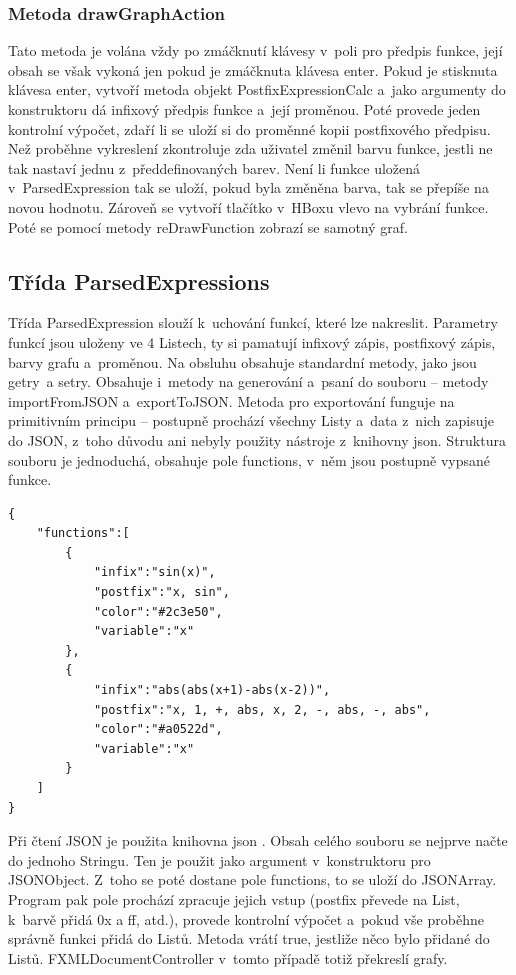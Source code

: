 \documentclass[a4paper,oneside,12p]{report}
\begin{document}
\subsubsection{Metoda drawGraphAction}

Tato metoda je volána vždy po zmáčknutí klávesy v~poli pro předpis funkce, její obsah se však vykoná jen pokud je zmáčknuta klávesa enter.
Pokud je stisknuta klávesa enter, vytvoří metoda objekt PostfixExpressionCalc a~jako argumenty do konstruktoru dá infixový předpis funkce a~její proměnou.
Poté provede jeden kontrolní výpočet, zdaří li se uloží si do proměnné kopii postfixového předpisu.
Než proběhne vykreslení zkontroluje zda uživatel změnil barvu funkce, jestli ne tak nastaví jednu z~předdefinovaných barev.
Není li funkce uložená v~ParsedExpression tak se uloží, pokud byla změněna barva, tak se přepíše na novou hodnotu.
Zároveň se vytvoří tlačítko v~HBoxu vlevo na vybrání funkce.
Poté se pomocí metody reDrawFunction zobrazí se samotný graf.

\subsection{Třída ParsedExpressions}
Třída ParsedExpression slouží k~uchování funkcí, které lze nakreslit.
Parametry funkcí jsou uloženy ve 4 Listech, ty si pamatují infixový zápis, postfixový zápis, barvy grafu a~proměnou.
Na obsluhu obsahuje standardní metody, jako jsou getry~a setry.
Obsahuje i~metody na generování a~psaní do souboru -- metody importFromJSON a~exportToJSON.
Metoda pro exportování funguje na primitivním principu -- postupně prochází všechny Listy a~data z~nich zapisuje do JSON, z~toho důvodu ani nebyly použity nástroje z~knihovny json.
Struktura souboru je jednoduchá, obsahuje pole functions, v~něm jsou postupně vypsané funkce.
\begin{lstlisting}[caption={Příklad JSON souboru},captionpos=b]
{
	"functions":[
		{
			"infix":"sin(x)",
			"postfix":"x, sin",
			"color":"#2c3e50",
			"variable":"x"
		},
		{
			"infix":"abs(abs(x+1)-abs(x-2))",
			"postfix":"x, 1, +, abs, x, 2, -, abs, -, abs",
			"color":"#a0522d",
			"variable":"x"
		}
	]
}

\end{lstlisting}

Při čtení JSON je použita knihovna json \cite{Stleary15}.
Obsah celého souboru se nejprve načte do jednoho Stringu.
Ten je použit jako argument v~konstruktoru pro JSONObject.
Z~toho se poté dostane pole functions, to se uloží do JSONArray.
Program pak pole prochází zpracuje jejich vstup (postfix převede na List, k~barvě přidá 0x a ff, atd.), provede kontrolní výpočet a~pokud vše proběhne správně funkci přidá do Listů.
Metoda vrátí true, jestliže něco bylo přidané do Listů.
FXMLDocumentController v~tomto případě totiž překreslí grafy.
\end{document}
